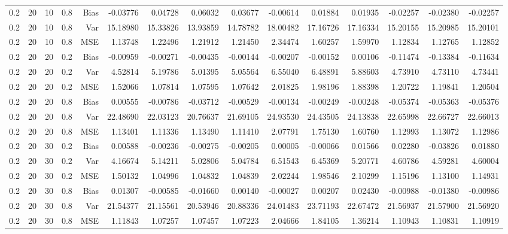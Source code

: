 \begin{table}[!htbp]
\begin{tabular}{lrrrrrrrrrrrrrr}
0.2 &  20 & 10 & 0.8 & Bias & -0.03776 & 0.04728 & 0.06032 & 0.03677 & -0.00614 & 0.01884 & 0.01935 & -0.02257 & -0.02380 & -0.02257 \\
0.2 &  20 & 10 & 0.8 & Var & 15.18980 & 15.33826 & 13.93859 & 14.78782 & 18.00482 & 17.16726 & 17.16334 & 15.20155 & 15.20985 & 15.20101 \\
0.2 &  20 & 10 & 0.8 & MSE & 1.13748 & 1.22496 & 1.21912 & 1.21450 & 2.34474 & 1.60257 & 1.59970 & 1.12834 & 1.12765 & 1.12852 \\
0.2 &  20 & 20 & 0.2 & Bias & -0.00959 & -0.00271 & -0.00435 & -0.00144 & -0.00207 & -0.00152 & 0.00106 & -0.11474 & -0.13384 & -0.11634 \\
0.2 &  20 & 20 & 0.2 & Var & 4.52814 & 5.19786 & 5.01395 & 5.05564 & 6.55040 & 6.48891 & 5.88603 & 4.73910 & 4.73110 & 4.73441 \\
0.2 &  20 & 20 & 0.2 & MSE & 1.52066 & 1.07814 & 1.07595 & 1.07642 & 2.01825 & 1.98196 & 1.88398 & 1.20722 & 1.19841 & 1.20504 \\
0.2 &  20 & 20 & 0.8 & Bias & 0.00555 & -0.00786 & -0.03712 & -0.00529 & -0.00134 & -0.00249 & -0.00248 & -0.05374 & -0.05363 & -0.05376 \\
0.2 &  20 & 20 & 0.8 & Var & 22.48690 & 22.03123 & 20.76637 & 21.69105 & 24.93530 & 24.43505 & 24.13838 & 22.65998 & 22.66727 & 22.66013 \\
0.2 &  20 & 20 & 0.8 & MSE & 1.13401 & 1.11336 & 1.13490 & 1.11410 & 2.07791 & 1.75130 & 1.60760 & 1.12993 & 1.13072 & 1.12986 \\
0.2 &  20 & 30 & 0.2 & Bias & 0.00588 & -0.00236 & -0.00275 & -0.00205 & 0.00005 & -0.00066 & 0.01566 & 0.02280 & -0.03826 & 0.01880 \\
0.2 &  20 & 30 & 0.2 & Var & 4.16674 & 5.14211 & 5.02806 & 5.04784 & 6.51543 & 6.45369 & 5.20771 & 4.60786 & 4.59281 & 4.60004 \\
0.2 &  20 & 30 & 0.2 & MSE & 1.50132 & 1.04996 & 1.04832 & 1.04839 & 2.02244 & 1.98546 & 2.10299 & 1.15196 & 1.13100 & 1.14931 \\
0.2 &  20 & 30 & 0.8 & Bias & 0.01307 & -0.00585 & -0.01660 & 0.00140 & -0.00027 & 0.00207 & 0.02430 & -0.00988 & -0.01380 & -0.00986 \\
0.2 &  20 & 30 & 0.8 & Var & 21.54377 & 21.15561 & 20.53946 & 20.88336 & 24.01483 & 23.71193 & 22.67472 & 21.56937 & 21.57900 & 21.56920 \\
0.2 &  20 & 30 & 0.8 & MSE & 1.11843 & 1.07257 & 1.07457 & 1.07223 & 2.04666 & 1.84105 & 1.36214 & 1.10943 & 1.10831 & 1.10919 \\

\end{tabular}
\end{table}
